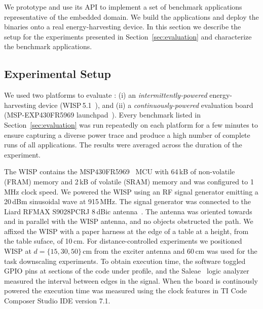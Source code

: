 We prototype \sys and use its API to implement a set of benchmark
applications representative of the embedded domain. We build the applications
and deploy the binaries onto a real energy-harvesting device. In this section
we describe the setup for the experiments presented in
Section~\ref{sec:evaluation} and characterize the benchmark applications.

\subsection{Experimental Setup}
\label{sec:results_hardware_software}

We used two platforms to evaluate \sys: (i) an \emph{intermittently-powered}
energy-harvesting device (WISP\,5.1~\cite{wisp5,wisp}), and (ii) a \emph{continuously-powered} evaluation
board (MSP-EXP430FR5969 launchpad~\cite{MSP-EXP430FR5969_launchpad}).
%
Every benchmark listed in Section~\ref{sec:evaluation} was run repeatedly on
each platform for a few minutes to ensure capturing a diverse power 
trace and produce a high number of complete runs of all applications.
The results were averaged across the duration of the experiment.

The WISP contains the MSP430FR5969~\cite{wolverine} MCU with 64\,kB of
non-volatile (FRAM) memory and 2\,kB of volatile (SRAM) memory and was
configured to 1\,MHz clock speed.
%
We powered the WISP using an RF signal generator emitting  a 20\,dBm sinusoidal wave at 915\,MHz.
The signal generator was connected to the Liard RFMAX S9028PCRJ 8\,dBic
antenna~\cite{atlas2015}.
%
The antenna was oriented towards and in parallel with the WISP antenna, and
no objects obstructed the path.
%
We affixed the WISP with a paper harness at the edge of a table at a height, from the table suface, of 10\,cm.
%
For distance-controlled experiments we positioned WISP at $d=\{15, 30,
50\}$\,cm from the exciter antenna and 60\,cm was used for the task downscaling
experiments.
%
%
To obtain execution time, the software toggled GPIO pins at sections of the code
under profile, and the Saleae~\cite{saleae} logic analyzer measured
the interval between edges in the signal. When the board is continously powered the 
execution time was measured using the clock features in TI Code Composer Studio IDE version 7.1.
%
